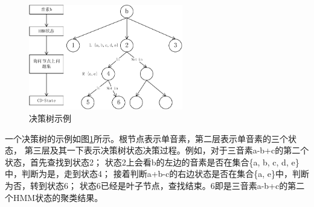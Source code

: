 \begin{figure}[htbp]
\centering
\includegraphics[width=0.6\textwidth]{figures/chapter4/tree-crop}
\caption{决策树示例}
\label{fig:tree}
\end{figure}

一个决策树的示例如图\ref{fig:tree}所示。根节点表示单音素，第二层表示单音素的三个状态，
第三层及其一下表示决策树状态决策过程。例如，对于三音素a-b+c的第二个状态，首先查找到状态2；
状态2上会看b的左边的音素是否在集合\{a, b, c, d, e\}中，判断为是，走到状态4；
接着判断a+b-c的右边状态是否在集合\{a, e\}中，判断为否，转到状态6；
状态6已经是叶子节点，查找结束。6即是三音素a-b+c的第二个HMM状态的聚类结果。

